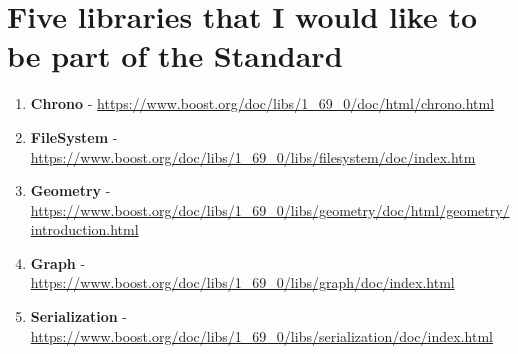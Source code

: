 \documentclass{article}
\begin{document}
\section*{Five libraries that I would like to be part of the Standard}
 \begin{enumerate}
  \item \textbf{Chrono} - \url{https://www.boost.org/doc/libs/1_69_0/doc/html/chrono.html}
  \item \textbf{FileSystem} - \url{https://www.boost.org/doc/libs/1_69_0/libs/filesystem/doc/index.htm}
  \item \textbf{Geometry} - \url{https://www.boost.org/doc/libs/1_69_0/libs/geometry/doc/html/geometry/introduction.html}
  \item \textbf{Graph} - \url{https://www.boost.org/doc/libs/1_69_0/libs/graph/doc/index.html}
  \item \textbf{Serialization} - \url{https://www.boost.org/doc/libs/1_69_0/libs/serialization/doc/index.html}
 \end{enumerate}
\end{document}
